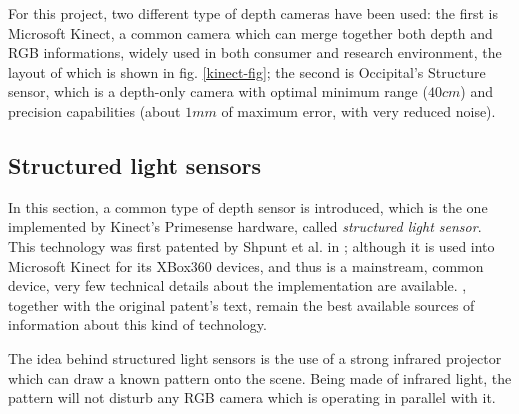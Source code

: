 For this project, two different type of depth cameras have been used: the first
is Microsoft Kinect, a common camera which can merge together both depth and RGB
informations, widely used in both consumer and research environment,
the layout of which is shown in fig. \ref{kinect-fig}; the second is Occipital's
Structure sensor, which is a depth-only camera with optimal minimum range
($40\unit{cm}$) and precision capabilities (about $1\unit{mm}$ of maximum error,
with very reduced noise).

\subsection{Structured light sensors}
In this section, a common type of depth sensor is introduced, which is the one
implemented by Kinect's Primesense hardware, called \emph{structured light
sensor}. This technology was first patented by Shpunt et al. in
\cite{primesense-patent}; although it is used into Microsoft Kinect for its
XBox360 devices, and thus is a mainstream, common device, very few technical
details about the implementation are available. \cite{how-kinect-work}, together
with the original patent's text, remain the best available sources of
information about this kind of technology.

The idea behind structured light sensors is the use of a strong infrared projector
which can draw a known pattern onto the scene. Being made of infrared light,
the pattern will not disturb any RGB camera which is operating in parallel with
it. 
